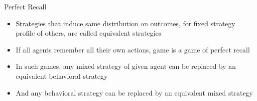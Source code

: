 \documentclass[11pt,aspectratio=169]{beamer}
\begin{document}
  \begin{frame}{Perfect Recall}
   \begin{itemize}[<+->]
   \setlength{\itemsep}{1.2em}
    \item Strategies that induce same distribution on outcomes, for fixed strategy profile of others, are called \alert{equivalent} strategies
    \item If all agents remember all their own actions, game is a game of \alert{perfect recall}
    \item In such games, any mixed strategy of given agent can be replaced by an \alert{equivalent} behavioral strategy
    \item And any behavioral strategy can be replaced by an \alert{equivalent} mixed strategy
   \end{itemize}
  \end{frame}
  
\end{document}
